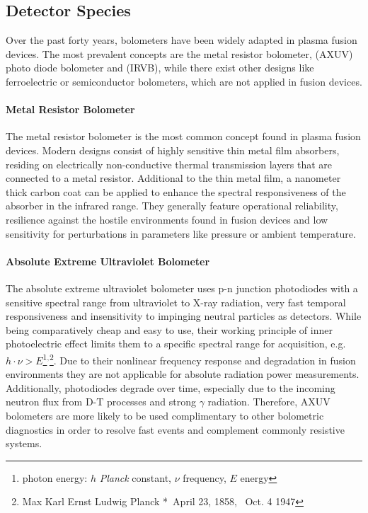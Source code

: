         \subsection*{Detector Species}\label{subsec:detectoradvant}%
%
            Over the past forty years\cite{Husan1975}, bolometers have been widely adapted in plasma fusion devices. The most prevalent concepts are the metal resistor bolometer,  (AXUV) photo diode bolometer and  (IRVB), while there exist other designs like ferroelectric\cite{Maio1997} or semiconductor\cite{Iborra1993} bolometers, which are not applied in fusion devices.%
%
            \paragraph{Metal Resistor Bolometer}%

                The metal resistor bolometer is the most common concept found in plasma fusion devices. Modern designs consist of highly sensitive thin metal film absorbers, residing on electrically non-conductive thermal transmission layers that are connected to a metal resistor. Additional to the thin metal film, a nanometer thick carbon coat can be applied to enhance the spectral responsiveness of the absorber in the infrared range\cite{Zhang2010}. They generally feature operational reliability, resilience against the hostile environments found in fusion devices and low sensitivity for perturbations in parameters like pressure or ambient temperature\cite{Mueller1984}.%
%
            \paragraph{Absolute Extreme Ultraviolet Bolometer}%

                The absolute extreme ultraviolet bolometer uses p-n junction photodiodes with a sensitive spectral range from ultraviolet to X-ray radiation, very fast temporal responsiveness and insensitivity to impinging neutral particles as detectors.\cite{Furno1999,Degeling2004} While being comparatively cheap and easy to use, their working principle of inner photoelectric effect limits them to a specific spectral range for acquisition, e.g. $h\cdot\nu>E$\footnote[1]{photon energy: $h$ \textit{Planck} constant, $\nu$ frequency, $E$ energy}$^{,}$\footnote[2]{Max Karl Ernst Ludwig Planck *~April 23, 1858, \textdagger~Oct. 4 1947}. Due to their nonlinear frequency response and degradation in fusion environments they are not applicable for absolute radiation power measurements. Additionally, photodiodes degrade over time, especially due to the incoming neutron flux from D-T processes and strong $\gamma$ radiation. Therefore, AXUV bolometers are more likely to be used complimentary to other bolometric diagnostics in order to resolve fast events and complement commonly resistive systems.\cite{Bernert2014}
%
